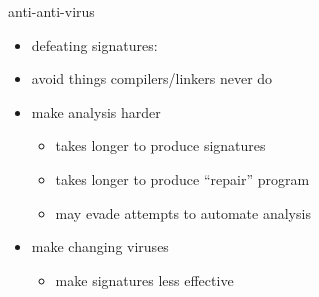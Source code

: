 
\begin{frame}{anti-anti-virus}
    \begin{itemize}
    \item defeating signatures:
    \vspace{.5cm}
    \item avoid things compilers/linkers never do
    \item make analysis harder
        \begin{itemize}
        \item takes longer to produce signatures
        \item takes longer to produce ``repair'' program
        \item may evade attempts to automate analysis
        \end{itemize}
    \item make changing viruses
        \begin{itemize}
        \item make signatures less effective
        \end{itemize}
    \end{itemize}
\end{frame}


